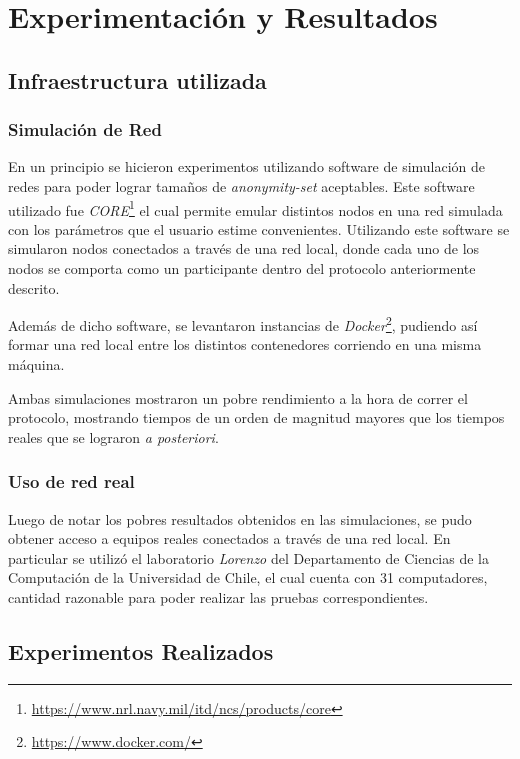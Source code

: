 \chapter{Experimentación y Resultados}\label{cap5}
\section{Infraestructura utilizada}

\subsection{Simulación de Red}

En un principio se hicieron experimentos utilizando software 
de simulación de redes para poder lograr tamaños de 
\emph{anonymity-set} aceptables. Este software utilizado fue 
\emph{CORE}\footnote{\url{https://www.nrl.navy.mil/itd/ncs/products/core}} 
el cual permite emular distintos nodos en una red simulada 
con los parámetros que el usuario estime convenientes. Utilizando 
este software se simularon nodos conectados a través de una red local, 
donde cada uno de los nodos se comporta como un participante dentro 
del protocolo anteriormente descrito.

Además de dicho software, se levantaron instancias de 
\emph{Docker}\footnote{\url{https://www.docker.com/}}, pudiendo así 
formar una red local entre los distintos contenedores corriendo 
en una misma máquina.

Ambas simulaciones mostraron un pobre rendimiento a la hora de 
correr el protocolo, mostrando tiempos de un orden de magnitud 
mayores que los tiempos reales que se lograron \emph{a posteriori}.

\subsection{Uso de red real}

Luego de notar los pobres resultados obtenidos en las simulaciones, se 
pudo obtener acceso a equipos reales conectados a través de una red 
local. En particular se utilizó el laboratorio \emph{Lorenzo} del 
Departamento de Ciencias de la Computación de la Universidad de Chile, el 
cual cuenta con 31 computadores, cantidad razonable para poder realizar 
las pruebas correspondientes.

\section{Experimentos Realizados}


